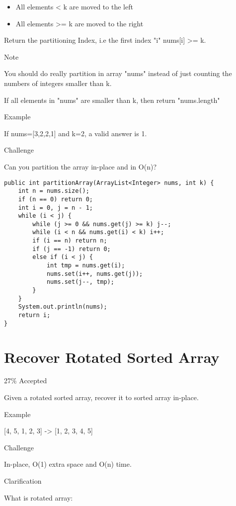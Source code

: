 \documentclass[9pt, b5paaper]{book}
\begin{document}
\begin{itemize}
\item All elements < k are moved to the left

\item All elements >= k are moved to the right
\end{itemize}

Return the partitioning Index, i.e the first index "i" nums[i] >= k.

Note

You should do really partition in array "nums" instead of just counting the numbers of integers smaller than k.

If all elements in "nums" are smaller than k, then return "nums.length"

Example

If nums=[3,2,2,1] and k=2, a valid answer is 1.

Challenge

Can you partition the array in-place and in O(n)?
\begin{verbatim}
public int partitionArray(ArrayList<Integer> nums, int k) {
    int n = nums.size();
    if (n == 0) return 0;
    int i = 0, j = n - 1;
    while (i < j) {
        while (j >= 0 && nums.get(j) >= k) j--;
        while (i < n && nums.get(i) < k) i++;
        if (i == n) return n;
        if (j == -1) return 0;
        else if (i < j) {
            int tmp = nums.get(i);
            nums.set(i++, nums.get(j));
            nums.set(j--, tmp);
        }
    }
    System.out.println(nums);
    return i;
}
\end{verbatim}
\section{Recover Rotated Sorted Array}
\label{sec-5-50}

27\% Accepted

Given a rotated sorted array, recover it to sorted array in-place.

Example

[4, 5, 1, 2, 3] -> [1, 2, 3, 4, 5]

Challenge

In-place, O(1) extra space and O(n) time.

Clarification

What is rotated array:
\end{document}
